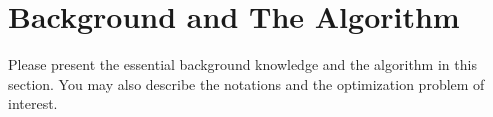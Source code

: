 \section{Background and The Algorithm}
\label{section:algorithm}
Please present the essential background knowledge and the algorithm in this section. You may also describe the notations and the optimization problem of interest.
